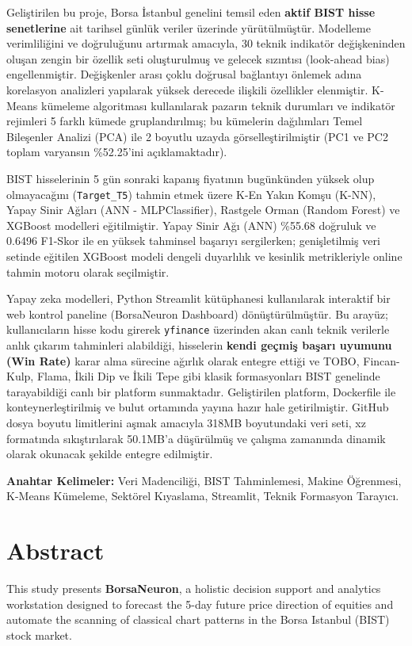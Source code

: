 \documentclass[12pt,a4paper]{report}
\begin{document}
Geliştirilen bu proje, Borsa İstanbul genelini temsil eden \textbf{aktif BIST hisse senetlerine} ait tarihsel günlük veriler üzerinde yürütülmüştür. Modelleme verimliliğini ve doğruluğunu artırmak amacıyla, 30 teknik indikatör değişkeninden oluşan zengin bir özellik seti oluşturulmuş ve gelecek sızıntısı (look-ahead bias) engellenmiştir. Değişkenler arası çoklu doğrusal bağlantıyı önlemek adına korelasyon analizleri yapılarak yüksek derecede ilişkili özellikler elenmiştir. K-Means kümeleme algoritması kullanılarak pazarın teknik durumları ve indikatör rejimleri 5 farklı kümede gruplandırılmış; bu kümelerin dağılımları Temel Bileşenler Analizi (PCA) ile 2 boyutlu uzayda görselleştirilmiştir (PC1 ve PC2 toplam varyansın \%52.25'ini açıklamaktadır).

BIST hisselerinin 5 gün sonraki kapanış fiyatının bugünkünden yüksek olup olmayacağını (\texttt{Target\_T5}) tahmin etmek üzere K-En Yakın Komşu (K-NN), Yapay Sinir Ağları (ANN - MLPClassifier), Rastgele Orman (Random Forest) ve XGBoost modelleri eğitilmiştir. Yapay Sinir Ağı (ANN) \%55.68 doğruluk ve 0.6496 F1-Skor ile en yüksek tahminsel başarıyı sergilerken; genişletilmiş veri setinde eğitilen XGBoost modeli dengeli duyarlılık ve kesinlik metrikleriyle online tahmin motoru olarak seçilmiştir.

Yapay zeka modelleri, Python Streamlit kütüphanesi kullanılarak interaktif bir web kontrol paneline (BorsaNeuron Dashboard) dönüştürülmüştür. Bu arayüz; kullanıcıların hisse kodu girerek \texttt{yfinance} üzerinden akan canlı teknik verilerle anlık çıkarım tahminleri alabildiği, hisselerin \textbf{kendi geçmiş başarı uyumunu (Win Rate)} karar alma sürecine ağırlık olarak entegre ettiği ve TOBO, Fincan-Kulp, Flama, İkili Dip ve İkili Tepe gibi klasik formasyonları BIST genelinde tarayabildiği canlı bir platform sunmaktadır. Geliştirilen platform, Dockerfile ile konteynerleştirilmiş ve bulut ortamında yayına hazır hale getirilmiştir. GitHub dosya boyutu limitlerini aşmak amacıyla 318MB boyutundaki veri seti, xz formatında sıkıştırılarak 50.1MB'a düşürülmüş ve çalışma zamanında dinamik olarak okunacak şekilde entegre edilmiştir.

\vspace*{1cm}
\noindent \textbf{Anahtar Kelimeler:} Veri Madenciliği, BIST Tahminlemesi, Makine Öğrenmesi, K-Means Kümeleme, Sektörel Kıyaslama, Streamlit, Teknik Formasyon Tarayıcı.

\newpage

\chapter*{Abstract}
This study presents \textbf{BorsaNeuron}, a holistic decision support and analytics workstation designed to forecast the 5-day future price direction of equities and automate the scanning of classical chart patterns in the Borsa Istanbul (BIST) stock market. 
\end{document}
